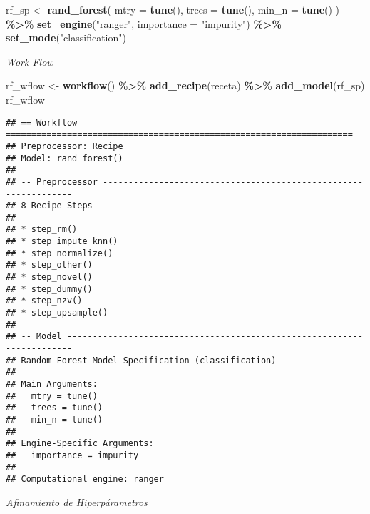 \documentclass[
]{article}
\newenvironment{Shaded}{\begin{snugshade}}{\end{snugshade}}
\newcommand{\AttributeTok}[1]{\textcolor[rgb]{0.13,0.29,0.53}{#1}}
\newcommand{\FunctionTok}[1]{\textcolor[rgb]{0.13,0.29,0.53}{\textbf{#1}}}
\newcommand{\NormalTok}[1]{#1}
\newcommand{\OtherTok}[1]{\textcolor[rgb]{0.56,0.35,0.01}{#1}}
\newcommand{\SpecialCharTok}[1]{\textcolor[rgb]{0.81,0.36,0.00}{\textbf{#1}}}
\newcommand{\StringTok}[1]{\textcolor[rgb]{0.31,0.60,0.02}{#1}}
\begin{document}
\begin{Shaded}
\begin{Highlighting}[]
\NormalTok{rf\_sp }\OtherTok{\textless{}{-}}
  \FunctionTok{rand\_forest}\NormalTok{(}
  \AttributeTok{mtry =} \FunctionTok{tune}\NormalTok{(), }\AttributeTok{trees =} \FunctionTok{tune}\NormalTok{(), }\AttributeTok{min\_n =} \FunctionTok{tune}\NormalTok{() ) }\SpecialCharTok{\%\textgreater{}\%}
  \FunctionTok{set\_engine}\NormalTok{(}\StringTok{"ranger"}\NormalTok{, }\AttributeTok{importance =} \StringTok{"impurity"}\NormalTok{) }\SpecialCharTok{\%\textgreater{}\%}
  \FunctionTok{set\_mode}\NormalTok{(}\StringTok{"classification"}\NormalTok{)}
\end{Highlighting}
\end{Shaded}

\emph{Work Flow}

\begin{Shaded}
\begin{Highlighting}[]
\NormalTok{rf\_wflow }\OtherTok{\textless{}{-}}
  \FunctionTok{workflow}\NormalTok{() }\SpecialCharTok{\%\textgreater{}\%}
  \FunctionTok{add\_recipe}\NormalTok{(receta) }\SpecialCharTok{\%\textgreater{}\%}
  \FunctionTok{add\_model}\NormalTok{(rf\_sp) }
\NormalTok{  rf\_wflow}
\end{Highlighting}
\end{Shaded}

\begin{verbatim}
## == Workflow ====================================================================
## Preprocessor: Recipe
## Model: rand_forest()
## 
## -- Preprocessor ----------------------------------------------------------------
## 8 Recipe Steps
## 
## * step_rm()
## * step_impute_knn()
## * step_normalize()
## * step_other()
## * step_novel()
## * step_dummy()
## * step_nzv()
## * step_upsample()
## 
## -- Model -----------------------------------------------------------------------
## Random Forest Model Specification (classification)
## 
## Main Arguments:
##   mtry = tune()
##   trees = tune()
##   min_n = tune()
## 
## Engine-Specific Arguments:
##   importance = impurity
## 
## Computational engine: ranger
\end{verbatim}

\emph{Afinamiento de Hiperpárametros}
\end{document}
